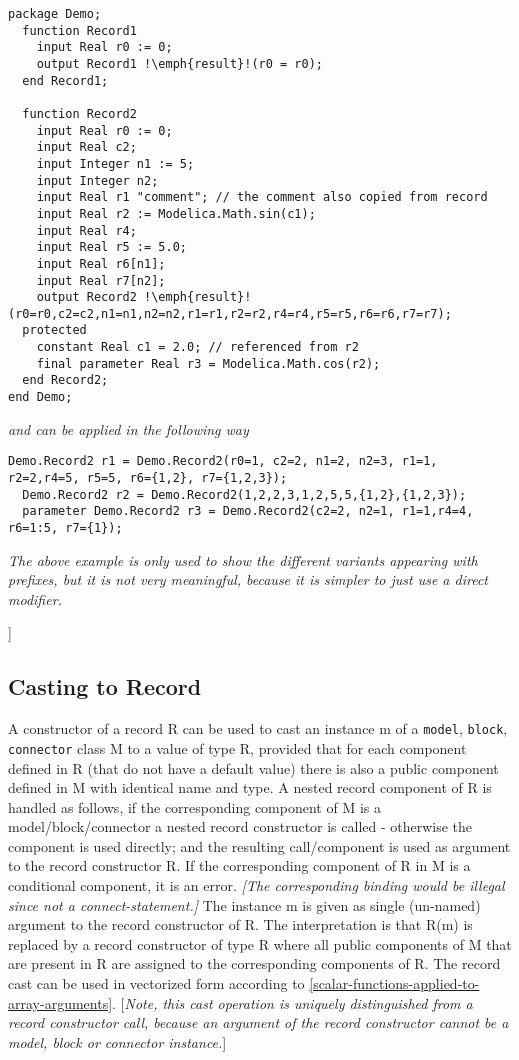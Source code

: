 \begin{lstlisting}[language=modelica,escapechar=!]
package Demo;
  function Record1
    input Real r0 := 0;
    output Record1 !\emph{result}!(r0 = r0);
  end Record1;

  function Record2
    input Real r0 := 0;
    input Real c2;
    input Integer n1 := 5;
    input Integer n2;
    input Real r1 "comment"; // the comment also copied from record
    input Real r2 := Modelica.Math.sin(c1);
    input Real r4;
    input Real r5 := 5.0;
    input Real r6[n1];
    input Real r7[n2];
    output Record2 !\emph{result}!(r0=r0,c2=c2,n1=n1,n2=n2,r1=r1,r2=r2,r4=r4,r5=r5,r6=r6,r7=r7);
  protected
    constant Real c1 = 2.0; // referenced from r2
    final parameter Real r3 = Modelica.Math.cos(r2);
  end Record2;
end Demo;
\end{lstlisting}
\emph{and can be applied in the following way}
\begin{lstlisting}[language=modelica]
  Demo.Record2 r1 = Demo.Record2(r0=1, c2=2, n1=2, n2=3, r1=1, r2=2,r4=5, r5=5, r6={1,2}, r7={1,2,3});
  Demo.Record2 r2 = Demo.Record2(1,2,2,3,1,2,5,5,{1,2},{1,2,3});
  parameter Demo.Record2 r3 = Demo.Record2(c2=2, n2=1, r1=1,r4=4, r6=1:5, r7={1});
\end{lstlisting}

\emph{The above example is only used to show the different variants
appearing with prefixes, but it is not very meaningful, because it is
simpler to just use a direct modifier.}

{]}

\subsection{Casting to Record}

A constructor of a record R can be used to cast an instance m of a
\lstinline!model!, \lstinline!block!, \lstinline!connector! class M to a value of type R, provided that for
each component defined in R (that do not have a default value) there is
also a public component defined in M with identical name and type. A
nested record component of R is handled as follows, if the corresponding
component of M is a model/block/connector a nested record constructor is
called - otherwise the component is used directly; and the resulting
call/component is used as argument to the record constructor R. If the
corresponding component of R in M is a conditional component, it is an
error. \emph{{[}The corresponding binding would be illegal since not a
connect-statement.{]}} The instance m is given as single (un-named)
argument to the record constructor of R. The interpretation is that R(m)
is replaced by a record constructor of type R where all public
components of M that are present in R are assigned to the corresponding
components of R. The record cast can be used in vectorized form
according to \autoref{scalar-functions-applied-to-array-arguments}. {[}\emph{Note, this cast operation is
uniquely distinguished from a record constructor call, because an
argument of the record constructor cannot be a model, block or connector
instance.}{]}

